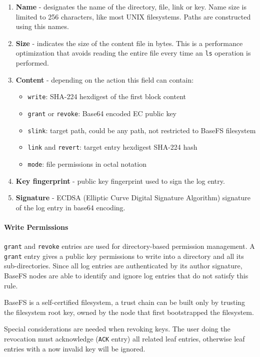 \documentclass{sig-alternate}
\begin{document}
\begin{enumerate}
\item \textbf{Name} - designates the name of the directory, file, link or key. Name size is limited to 256 characters, like most UNIX filesystems. Paths are constructed using this names.
\item \textbf{Size} - indicates the size of the content file in bytes. This is a performance optimization that avoids reading the entire file every time an \texttt{ls} operation is performed.
\item \textbf{Content} - depending on the action this field can contain:
    \begin{itemize}
    \item \texttt{write}: SHA-224 hexdigest of the first block content
    \item \texttt{grant} or \texttt{revoke}: Base64 encoded EC public key
    \item \texttt{slink}: target path, could be any path, not restricted to BaseFS filesystem
    \item \texttt{link} and \texttt{revert}: target entry hexdigest SHA-224 hash
    \item \texttt{mode}: file permissions in octal notation
    \end{itemize}
\item \textbf{Key fingerprint} - public key fingerprint used to sign the log entry.
\item \textbf{Signature} - ECDSA (Elliptic Curve Digital Signature Algorithm) signature of the log entry in base64 encoding.
\end{enumerate}


\paragraph{Write Permissions}

\texttt{grant} and \texttt{revoke} entries are used for directory-based permission management. A \texttt{grant} entry gives a public key permissions to write into a directory and all its sub-directories. Since all log entries are authenticated by its author signature, BaseFS nodes are able to identify and ignore log entries that do not satisfy this rule. 

BaseFS is a self-certified filesystem, a trust chain can be built only by trusting the filesystem root key, owned by the node that first bootstrapped the filesystem.

Special considerations are needed when revoking keys. The user doing the revocation must acknowledge (\texttt{ACK} entry) all related leaf entries, otherwise leaf entries with a now invalid key will be ignored.
\end{document}
